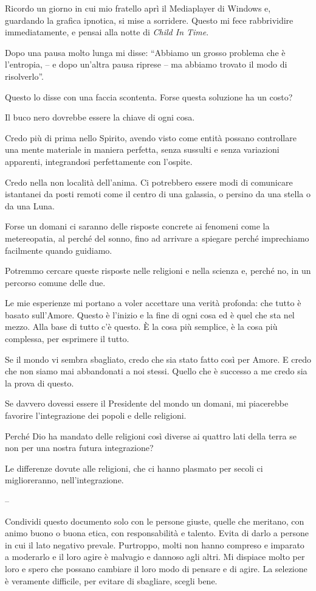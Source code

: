 Ricordo un giorno in cui mio fratello aprì il Mediaplayer di Windows e, guardando la grafica ipnotica, si mise a sorridere. Questo mi fece rabbrividire immediatamente, e pensai alla notte di \textit{Child In Time}.

Dopo una pausa molto lunga mi disse: “Abbiamo un grosso problema che è l'entropia, --  e dopo un'altra pausa riprese -- ma abbiamo trovato il modo di risolverlo”.

Questo lo disse con una faccia scontenta. Forse questa soluzione ha un costo?

Il buco nero dovrebbe essere la chiave di ogni cosa.

Credo più di prima nello Spirito, avendo visto come entità possano controllare una mente materiale in maniera perfetta, senza sussulti e senza variazioni apparenti, integrandosi perfettamente con l'ospite.

Credo nella non località dell'anima. Ci potrebbero essere modi di comunicare istantanei da posti remoti come il centro di una galassia, o persino da una stella o da una Luna.

Forse un domani ci saranno delle risposte concrete ai fenomeni come la metereopatia, al perché del sonno, fino ad arrivare a spiegare perché imprechiamo facilmente quando guidiamo.

Potremmo cercare queste risposte nelle religioni e nella scienza e, perché no, in un percorso comune delle due.

Le mie esperienze mi portano a voler accettare una verità profonda: che tutto è basato sull'Amore. Questo è l'inizio e la fine di ogni cosa ed è quel che sta nel mezzo. Alla base di tutto c'è questo. È la cosa più semplice, è la cosa più complessa, per esprimere il tutto.

Se il mondo vi sembra sbagliato, credo che sia stato fatto così per Amore. E credo che non siamo mai abbandonati a noi stessi. Quello che è successo a me credo sia la prova di questo.

Se davvero dovessi essere il Presidente del mondo un domani, mi piacerebbe favorire l'integrazione dei popoli e delle religioni.

Perché Dio ha mandato delle religioni così diverse ai quattro lati della terra se non per una nostra futura integrazione?

Le differenze dovute alle religioni, che ci hanno plasmato per secoli ci miglioreranno, nell'integrazione.

\begin{center}
--
\end{center}

Condividi questo documento solo con le persone giuste, quelle che meritano, con animo buono o buona etica, con responsabilità e talento. Evita di darlo a persone in cui il lato negativo prevale. Purtroppo, molti non hanno compreso e imparato a moderarlo e il loro agire è malvagio e dannoso agli altri. Mi dispiace molto per loro e spero che possano cambiare il loro modo di pensare e di agire. La selezione è veramente difficile, per evitare di sbagliare, scegli bene.
